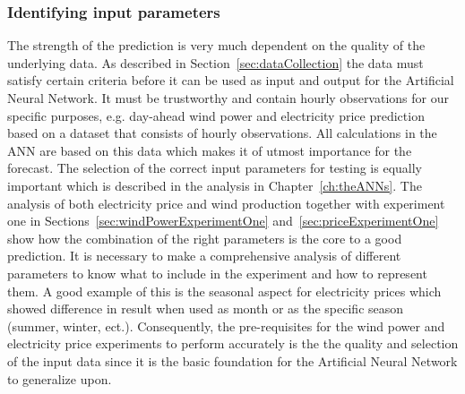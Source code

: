 \subsubsection{Identifying input parameters}
The strength of the prediction is very much dependent on the quality of the underlying data. As described in Section~\ref{sec:dataCollection} the data must satisfy certain criteria before it can be used as input and output for the Artificial Neural Network. It must be trustworthy and contain hourly observations for our specific purposes, e.g. day-ahead wind power and electricity price prediction based on a dataset that consists of hourly observations. All calculations in the ANN are based on this data which makes it of utmost importance for the forecast. The selection of the correct input parameters for testing is equally important which is described in the analysis in Chapter~\ref{ch:theANNs}. The analysis of both electricity price and wind production together with experiment one in Sections~\ref{sec:windPowerExperimentOne} and~\ref{sec:priceExperimentOne} show how the combination of the right parameters is the core to a good prediction. It is necessary to make a comprehensive analysis of different parameters to know what to include in the experiment and how to represent them. A good example of this is the seasonal aspect for electricity prices which showed difference in result when used as month or as the specific season (summer, winter, ect.). Consequently, the pre-requisites for the wind power and electricity price experiments to perform accurately is the the quality and selection of the input data since it is the basic foundation for the Artificial Neural Network to generalize upon.

